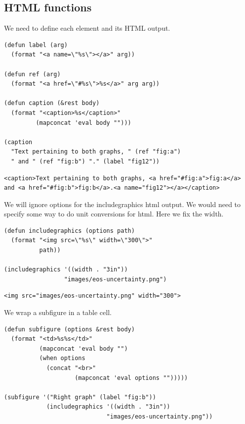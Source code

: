 \documentclass[11pt]{article}
\begin{document}
\subsection{HTML functions}
\label{sec-1-2}
We need to define each element and its HTML output.
\begin{verbatim}
(defun label (arg)
  (format "<a name=\"%s\"></a>" arg))

(defun ref (arg)
  (format "<a href=\"#%s\">%s</a>" arg arg))

(defun caption (&rest body)
  (format "<caption>%s</caption>"
         (mapconcat 'eval body "")))

(caption
  "Text pertaining to both graphs, " (ref "fig:a")
  " and " (ref "fig:b") "." (label "fig12"))
\end{verbatim}

\begin{verbatim}
<caption>Text pertaining to both graphs, <a href="#fig:a">fig:a</a> and <a href="#fig:b">fig:b</a>.<a name="fig12"></a></caption>
\end{verbatim}


We will ignore options for the includegraphics html output. We would need to specify some way to do unit conversions for html. Here we fix the width.
\begin{verbatim}
(defun includegraphics (options path)
  (format "<img src=\"%s\" width=\"300\">"
          path))

(includegraphics '((width . "3in"))
                 "images/eos-uncertainty.png")
\end{verbatim}

\begin{verbatim}
<img src="images/eos-uncertainty.png" width="300">
\end{verbatim}

We wrap a subfigure in a table cell.
\begin{verbatim}
(defun subfigure (options &rest body)
  (format "<td>%s%s</td>"
          (mapconcat 'eval body "")
          (when options
            (concat "<br>"
                    (mapconcat 'eval options "")))))

(subfigure '("Right graph" (label "fig:b"))
            (includegraphics '((width . "3in"))
                             "images/eos-uncertainty.png"))
\end{verbatim}
\end{document}
